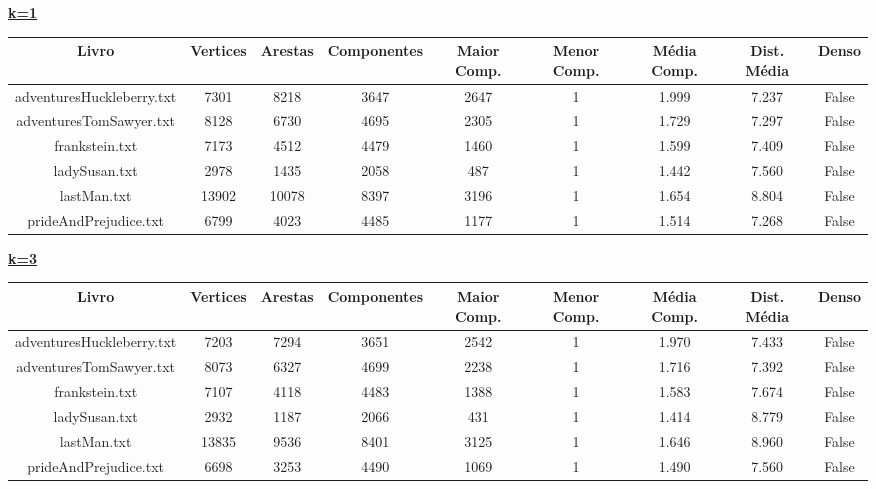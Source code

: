 \documentclass[12pt]{article}
\newcommand{\mytitle}[1]{\textbf{\underline{#1}}}
\begin{document}
\noindent\mytitle{k=1}
\begin{center}
\begin{tabular}{||c | c | c | c | c | c | c | c | c||}
\hline
Livro & Vertices & Arestas & Componentes & Maior Comp. & Menor Comp. & Média Comp. & Dist. Média & Denso \\ [0.5ex]
\hline\hline
adventuresHuckleberry.txt & 7301 & 8218 & 3647 & 2647 & 1 & 1.999 & 7.237 & False \\
\hline
adventuresTomSawyer.txt & 8128 & 6730 & 4695 & 2305 & 1 & 1.729 & 7.297 & False \\
\hline
frankstein.txt & 7173 & 4512 & 4479 & 1460 & 1 & 1.599 & 7.409 & False \\
\hline
ladySusan.txt & 2978 & 1435 & 2058 & 487 & 1 & 1.442 & 7.560 & False \\
\hline
lastMan.txt & 13902 & 10078 & 8397 & 3196 & 1 & 1.654 & 8.804 & False \\
\hline
prideAndPrejudice.txt & 6799 & 4023 & 4485 & 1177 & 1 & 1.514 & 7.268 & False \\
\hline
\end{tabular}
\end{center}

\noindent\mytitle{k=3}
\begin{center}
\begin{tabular}{||c | c | c | c | c | c | c | c | c||}
\hline
Livro & Vertices & Arestas & Componentes & Maior Comp. & Menor Comp. & Média Comp. & Dist. Média & Denso \\ [0.5ex]
\hline\hline
adventuresHuckleberry.txt & 7203 & 7294 & 3651 & 2542 & 1 & 1.970 & 7.433 & False \\
\hline
adventuresTomSawyer.txt & 8073 & 6327 & 4699 & 2238 & 1 & 1.716 & 7.392 & False \\
\hline
frankstein.txt & 7107 & 4118 & 4483 & 1388 & 1 & 1.583 & 7.674 & False \\
\hline
ladySusan.txt & 2932 & 1187 & 2066 & 431 & 1 & 1.414 & 8.779 & False \\
\hline
lastMan.txt & 13835 & 9536 & 8401 & 3125 & 1 & 1.646 & 8.960 & False \\
\hline
prideAndPrejudice.txt & 6698 & 3253 & 4490 & 1069 & 1 & 1.490 & 7.560 & False \\
\hline
\end{tabular}
\end{center}
\end{document}
